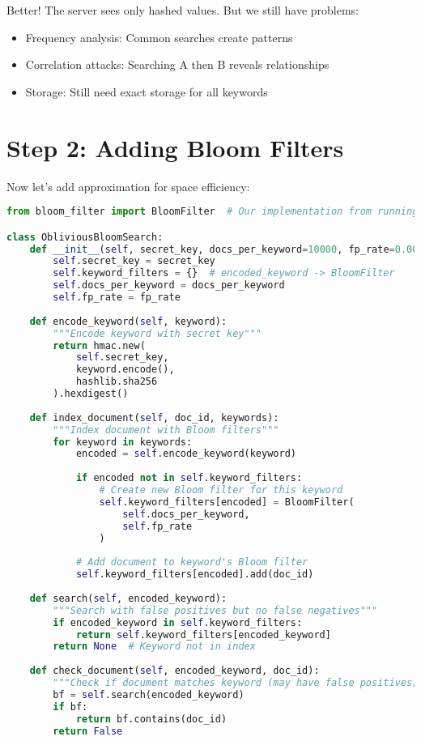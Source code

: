 Better! The server sees only hashed values. But we still have problems:
\begin{itemize}
    \item Frequency analysis: Common searches create patterns
    \item Correlation attacks: Searching A then B reveals relationships
    \item Storage: Still need exact storage for all keywords
\end{itemize}

\section{Step 2: Adding Bloom Filters}

Now let's add approximation for space efficiency:

\begin{lstlisting}[language=Python, caption=Bloom filters for space-efficient oblivious search]
from bloom_filter import BloomFilter  # Our implementation from running example

class ObliviousBloomSearch:
    def __init__(self, secret_key, docs_per_keyword=10000, fp_rate=0.001):
        self.secret_key = secret_key
        self.keyword_filters = {}  # encoded_keyword -> BloomFilter
        self.docs_per_keyword = docs_per_keyword
        self.fp_rate = fp_rate
    
    def encode_keyword(self, keyword):
        """Encode keyword with secret key"""
        return hmac.new(
            self.secret_key,
            keyword.encode(),
            hashlib.sha256
        ).hexdigest()
    
    def index_document(self, doc_id, keywords):
        """Index document with Bloom filters"""
        for keyword in keywords:
            encoded = self.encode_keyword(keyword)
            
            if encoded not in self.keyword_filters:
                # Create new Bloom filter for this keyword
                self.keyword_filters[encoded] = BloomFilter(
                    self.docs_per_keyword, 
                    self.fp_rate
                )
            
            # Add document to keyword's Bloom filter
            self.keyword_filters[encoded].add(doc_id)
    
    def search(self, encoded_keyword):
        """Search with false positives but no false negatives"""
        if encoded_keyword in self.keyword_filters:
            return self.keyword_filters[encoded_keyword]
        return None  # Keyword not in index
    
    def check_document(self, encoded_keyword, doc_id):
        """Check if document matches keyword (may have false positives)"""
        bf = self.search(encoded_keyword)
        if bf:
            return bf.contains(doc_id)
        return False
\end{lstlisting}

